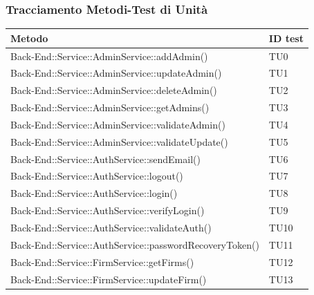 \documentclass[../PianoDiQualifica_v4.0.0.tex]{subfiles}
\begin{document}
	\newpage
	\subsubsection{Tracciamento Metodi-Test di Unità}
	\begin{longtable}[c] {>{\centering\arraybackslash}p{} >{\centering\arraybackslash}p{}}
		\toprule
		\centerline{\textbf{Metodo}} & \centerline{\textbf{ID test}}  \\
			\midrule
	 		Back-End::Service::AdminService::addAdmin() & TU0 \\
	 		\addlinespace[0.3em]
			\midrule
			\addlinespace[0.3em]
			Back-End::Service::AdminService::updateAdmin() & TU1 \\
			\addlinespace[0.3em]
			\midrule
			\addlinespace[0.3em]
 			Back-End::Service::AdminService::deleteAdmin() & TU2 \\
 			\addlinespace[0.3em]
			\midrule
			\addlinespace[0.3em]
 			Back-End::Service::AdminService::getAdmins() & TU3 \\
 			\addlinespace[0.3em]
			\midrule
			\addlinespace[0.3em]
			Back-End::Service::AdminService::validateAdmin() & TU4 \\
 			\addlinespace[0.3em]
			\midrule
			\addlinespace[0.3em]
 			Back-End::Service::AdminService::validateUpdate() & TU5 \\
 			\addlinespace[0.3em]
			\midrule
			\addlinespace[0.3em]
 			Back-End::Service::AuthService::sendEmail() & TU6 \\
 			\addlinespace[0.3em]
			\midrule
			\addlinespace[0.3em]
 			Back-End::Service::AuthService::logout() & TU7 \\
 			\addlinespace[0.3em]
			\midrule
			\addlinespace[0.3em]
 			Back-End::Service::AuthService::login() & TU8 \\
 			\addlinespace[0.3em]
			\midrule
			\addlinespace[0.3em]
			Back-End::Service::AuthService::verifyLogin() & TU9 \\
 			\addlinespace[0.3em]
			\midrule
			\addlinespace[0.3em]
			Back-End::Service::AuthService::validateAuth() & TU10 \\
 			\addlinespace[0.3em]
			\midrule
			\addlinespace[0.3em]
			Back-End::Service::AuthService::passwordRecoveryToken() & TU11 \\
 			\addlinespace[0.3em]
			\midrule
			\addlinespace[0.3em]
			Back-End::Service::FirmService::getFirms() & TU12 \\
 			\addlinespace[0.3em]
			\midrule
			\addlinespace[0.3em]
			Back-End::Service::FirmService::updateFirm() & TU13 \\

\end{longtable}
\end{document}
